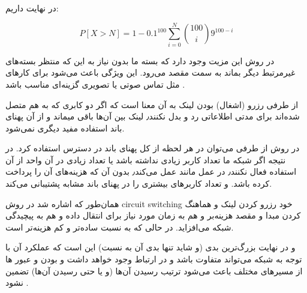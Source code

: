 در نهایت داریم:

\begin{equation*}
	P [X > N] = 1 - 0.1^{100} \sum_{i=0}^{N} {100 \choose i} 9^{100-i} 
\end{equation*}

\subproblem{}
در روش 
این مزیت وجود دارد که بسته ما بدون نیاز به این 
که منتظر بسته‌های غیرمرتبط دیگر بماند به سمت مقصد می‌رود.
این ویژگی باعث می‌شود برای کارهای
مثل تماس‌ صوتی یا تصویری
گزینه‌ای مناسب باشد
.

از طرفی رزرو (اشغال) بودن لینک به آن معنا است که اگر دو کابری که به هم متصل شده‌اند برای مدتی اطلاعاتی
رد و بدل نکنند٫ لینک بین آن‌ها 
باقی میماند و از آن پهنای باند استفاده مفید دیگری نمی‌شود. 

در روش 
از طرفی می‌توان در هر لحظه از کل پهنای باند در دسترس استفاده کرد. در نتیجه اگر شبکه ما تعداد کاربر زیادی نداشته باشد یا تعداد زیادی در آن واحد از آن استفاده فعال نکنند٫
در عمل مانند 
عمل می‌کند٫ بدون آن که هزینه‌های آن را پرداخت کرده باشد.
و تعداد کاربرهای بیشتری را در  پهنای باند مشابه پشتیبانی می‌کند.


همان‌طور که اشاره شد در روش circuit switching خود رزرو کردن لینک و هماهنگ کردن مبدا و مقصد هزینه‌بر و هم به زمان مورد نیاز برای انتقال داده و هم به پیچیدگی شبکه می‌افزاید. در حالی که 
به نسبت ساده‌تر و کم هزینه‌تر است.

و در نهایت بزرگ‌‌‌ترین بدی 
(و شاید تنها بدی آن به نسبت)
این است که عملکرد آن با توجه به 
شبکه می‌تواند متفاوت باشد و در ارتباط
وجود خواهد داشت و 
بودن 
و عبور 
ها از مسیرهای مختلف
باعث می‌شود ترتیب رسیدن آن‌ها
(و یا حتی رسیدن آن‌ها)
تضمین نشود
.


